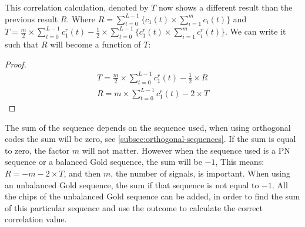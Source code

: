 This correlation calculation, denoted by $T$ now shows a different result than the previous result $R$.
Where $R = \displaystyle\sum_{t = 0} ^ {L - 1}  \Bigg\{  c_1(t)	\times \displaystyle\sum_{i = 1} ^ {m} c_i(t) \Bigg\}$ and $T = \frac{m}{2} \times \displaystyle\sum_{t = 0} ^ {L - 1} c^r_1(t) - \frac{1}{2} \times \displaystyle\sum_{t = 0} ^ {L - 1}  \Bigg\{ c^r_1(t) \times \displaystyle\sum_{i = 1} ^ {m} c^r_i(t) \Bigg\}$.
We can write it such that $R$ will become a function of $T$: 

\begin{proof}

	\begin{align*}
	T = \frac{m}{2} \times \displaystyle\sum_{t = 0} ^ {L - 1} c^r_1(t) - \frac{1}{2} \times R
	\\ R = m \times \displaystyle\sum_{t = 0} ^ {L - 1} c^r_1(t) - 2 \times T
	\end{align*}

\end{proof}

The sum of the sequence depends on the sequence used, when using orthogonal codes the sum will be zero, see \autoref{subsec:orthogonal-sequences}.
If the sum is equal to zero, the factor $m$ will not matter.
However when the sequence used is a PN sequence or a balanced Gold sequence, the sum will be $-1$, This means: $R = -m - 2 \times T$, and then $m$, the number of signals, is important.
When using an unbalanced Gold sequence, the sum if that sequence is not equal to $-1$.
All the chips of the unbalanced Gold sequence can be added, in order to find the sum of this particular sequence and use the outcome to calculate the correct correlation value.










